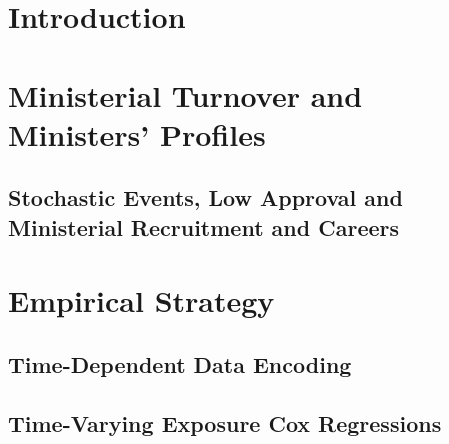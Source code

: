 \documentclass[12pt,halfline,a4paper]{ouparticle}
\begin{document}

\maketitle

\section{Introduction}
\label{sec1}

\section{Ministerial Turnover and Ministers’ Profiles}
\label{sec2}

\subsection{Stochastic Events, Low Approval and Ministerial Recruitment and Careers}
\label{sec2.1}

\section{Empirical Strategy}
\label{sec3}

\subsection{Time-Dependent Data Encoding}
\label{sec3.1}

\subsection{Time-Varying Exposure Cox Regressions}
\label{sec3.2}

\end{document}
